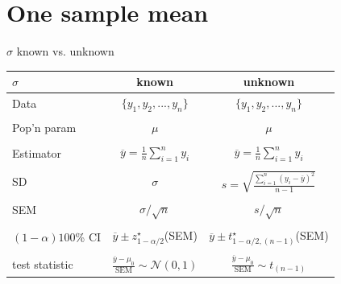 \documentclass{beamer}\usepackage[]{graphicx}\usepackage[]{color}
\begin{document}
\section{One sample mean}


\begin{frame}{$\sigma$ known vs. unknown}
\begin{center}
	\begin{tabular}{|l|c|c|} \hline
		$\sigma$& known & unknown \\ \hline Data & $\{y_1,y_2,...,y_n\}$ &
		$\{y_1,y_2,...,y_n\}$\\
		& & \\
		Pop'n param & $\mu$ & $\mu$\\
		& & \\
		Estimator & $\overline{y} = \frac{1}{n}\sum_{i=1}^n y_i$ & $\overline{y} = \frac{1}{n}\sum_{i=1}^n y_i$ \\
		& & \\
		SD & $\sigma$ & $s = \sqrt{\frac{\sum_{i=1}^n(y_i-\overline{y})^2}{n-1}}$ \\
		& & \\
		SEM & $\sigma/\sqrt{n}$ & $s / \sqrt{n}$ \\
		& & \\
		$(1-\alpha)100$\% CI & $\overline{y} \pm z^\star_{1-\alpha/2}$(SEM) & $\overline{y} \pm t^\star_{1-\alpha/2, (n-1)}$(SEM) \\
		& & \\
		test statistic & $\frac{\overline{y}-\mu_0}{\textrm{SEM}}\sim \mathcal{N}(0,1)$ &
		$\frac{\overline{y}-\mu_0}{\textrm{SEM}}\sim t_{(n-1)}$ \\
		\hline
	\end{tabular}
\end{center}
\end{frame}
\end{document}
